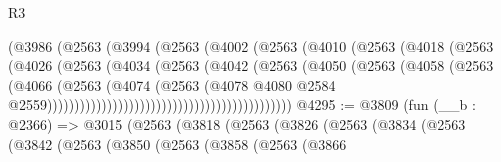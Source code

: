 \begin{lexlean}{R3}
\begin{coremodule}
                                            (@3986
                                              (@2563
                                                (@3994
                                                  (@2563
                                                    (@4002
                                                      (@2563
                                                        (@4010
                                                          (@2563
                                                            (@4018
                                                              (@2563
                                                                (@4026
                                                                  (@2563
                                                                    (@4034
                                                                      (@2563
                                                                        (@4042
                                                                          (@2563
                                                                            (@4050
                                                                              (@2563
                                                                                (@4058
                                                                                  (@2563
                                                                                    (@4066
                                                                                      (@2563
                                                                                        (@4074
                                                                                          (@2563
                                                                                            (@4078
                                                                                              @4080
                                                                                              @2584
                                                                                              @2559)))))))))))))))))))))))))))))))))))))))))))))
@4295 := @3809
    (fun (__b : @2366) =>
    @3015
      (@2563
        (@3818
          (@2563
            (@3826
              (@2563
                (@3834
                  (@2563
                    (@3842
                      (@2563
                        (@3850
                          (@2563
                            (@3858
                              (@2563
                                (@3866

\end{coremodule}
\end{lexlean}
